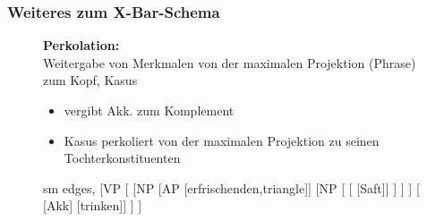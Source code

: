 \begin{frame}
\frametitle{Weiteres zum X-Bar-Schema}

\begin{figure}[b]

  	\begin{minipage}[b]{0.45\textwidth}
	\textbf{Perkolation:}\\
	 Weitergabe von Merkmalen von der maximalen Projektion (Phrase) zum Kopf, \zB Kasus
	 \begin{itemize}
	 	\item {} vergibt Akk. zum Komplement
	 	\item Kasus perkoliert von der maximalen Projektion zu seinen Tochterkonstituenten
	 \end{itemize}
  	\end{minipage}  
	\begin{minipage}[b]{0.45\textwidth}
	\centering
	\footnotesize{
		\begin{forest}
		sm edges,
		[VP 
			[ 
				[NP 
					[AP [erfrischenden,triangle]]
					[NP
						[ 
							[ [Saft]]
						]
					]
				]
				[\alert{} \\\alert{{[}Akk{]}} [trinken]]
			]
		]
		\end{forest}
		}
  	\end{minipage}  
\end{figure}

\end{frame}


